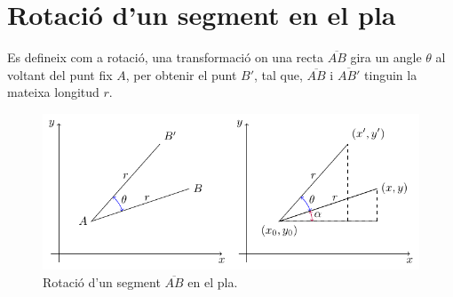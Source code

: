 \documentclass[12pt,a4paper]{report}
\begin{document}
\section{Rotació d'un segment en el pla}\label{annex_1}
Es defineix com a rotació, una transformació on una recta $\overline{AB}$ gira un angle $\theta$ al voltant del punt fix $A$, per obtenir el punt $B'$, tal que, $\overline{AB}$ i $\overline{AB'}$ tinguin la mateixa longitud $r$.
\begin{figure}[!ht]
\centering
\includegraphics[width=1\textwidth]{img/img06_rotation.pdf}
\caption{Rotació d'un segment $\overline{AB}$ en el pla.}
\label{img06_rotation}
\end{figure}
\end{document}
